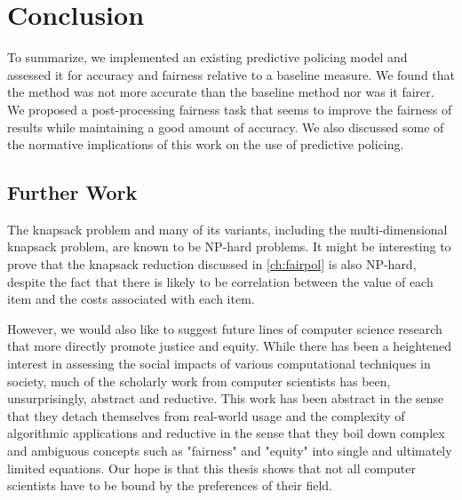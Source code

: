\chapter{Conclusion}\label{ch:conclusion}


To summarize, we implemented an existing predictive policing model and assessed it for accuracy and fairness relative to a baseline measure. We found that the method was not more accurate than the baseline method nor was it fairer. We proposed a post-processing fairness task that seems to improve the fairness of results while maintaining a good amount of accuracy. We also discussed some of the normative implications of this work on the use of predictive policing.

\section{Further Work}
The knapsack problem and many of its variants, including the multi-dimensional knapsack problem, are known to be NP-hard problems. It might be interesting to prove that the knapsack reduction discussed in \autoref{ch:fairpol} is also NP-hard, despite the fact that there is likely to be correlation between the value of each item and the costs associated with each item.

However, we would also like to suggest future lines of computer science research that more directly promote justice and equity. While there has been a heightened interest in assessing the social impacts of various computational techniques in society, much of the scholarly work from computer scientists has been, unsurprisingly, abstract and reductive. This work has been abstract in the sense that they detach themselves from real-world usage and the complexity of algorithmic applications and reductive in the sense that they boil down complex and ambiguous concepts such as "fairness" and "equity" into single and ultimately limited equations. Our hope is that this thesis shows that not all computer scientists have to be bound by the preferences of their field.

